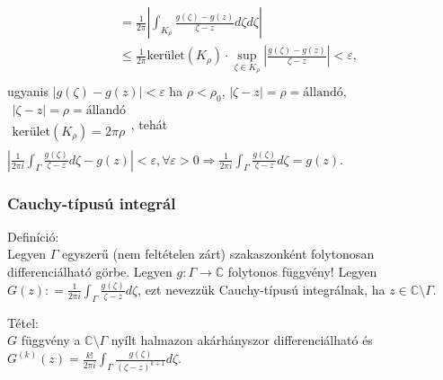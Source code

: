 \documentclass[12pt,a4paper]{scrartcl}
\newenvironment{definicio}{}{}
\newenvironment{tetel}{}{}
\newenvironment{bizonyitas}{}{}
\begin{document}
\begin{bizonyitas}
\[\begin{aligned}
   &  = \frac{1}{{2\pi }}\left| {\int_{{K_\rho }} {\frac{{g\left( \zeta  \right) - g\left( z \right)}}{{\zeta  - z}}d\zeta } d\zeta } \right| \\ 
   &  \leqslant \frac{1}{{2\pi }}{\text{kerület}}\left( {{K_\rho }} \right) \cdot \mathop {\sup }\limits_{\zeta  \in {K_\rho }} \left| {\frac{{g\left( \zeta  \right) - g\left( z \right)}}{{\zeta  - z}}} \right| < \varepsilon,  \\ 
\end{aligned} \] ugyanis
\(\left| {g\left( \zeta \right) - g\left( z \right)} \right| < \varepsilon\)
ha \(\rho < \rho_{0}\),
\(\left| {\zeta - z} \right| = \rho = \text{állandó}\),
\(\begin{matrix} {\left| {\zeta - z} \right| = \rho = \text{állandó}} \\ {\text{kerület}\left( K_{\rho} \right) = 2\pi\rho} \\ \end{matrix}\),
tehát
\(\left. \left| {\frac{1}{2\pi i}{\int_{\Gamma}{\frac{g\left( \zeta \right)}{\zeta - z}d\zeta}} - g\left( z \right)} \right| < \varepsilon,\forall\varepsilon > 0\Rightarrow\frac{1}{2\pi i}{\int_{\Gamma}{\frac{g\left( \zeta \right)}{\zeta - z}d\zeta}} = g\left( z \right) \right.\).

\end{bizonyitas}

\hypertarget{cauchy-tipusu-integral}{%
\subsubsection{Cauchy-típusú integrál}\label{cauchy-tipusu-integral}}

\begin{definicio}

Definíció:\\
Legyen \(\Gamma\) egyszerű (nem feltételen zárt) szakaszonként
folytonosan differenciálható görbe. Legyen
\(\left. g:\Gamma\rightarrow{\mathbb{C}} \right.\) folytonos függvény!
Legyen
\(G(z): = \frac{1}{2\pi i}{\int_{\Gamma}{\frac{g\left( \zeta \right)}{\zeta - z}d\zeta}}\),
ezt nevezzük Cauchy-típusú integrálnak, ha
\(z \in {\mathbb{C}}\text{\textbackslash}\Gamma\).

\end{definicio}

\begin{tetel}

Tétel:\\
\(G\) függvény a \({\mathbb{C}}\text{\textbackslash}\Gamma\) nyílt
halmazon akárhányszor differenciálható és
\(G^{(k)}\left( z \right) = \frac{k!}{2\pi i}{\int_{\Gamma}{\frac{g\left( \zeta \right)}{\left( {\zeta - z} \right)^{k + 1}}d\zeta}}\).

\end{tetel}
\end{document}
